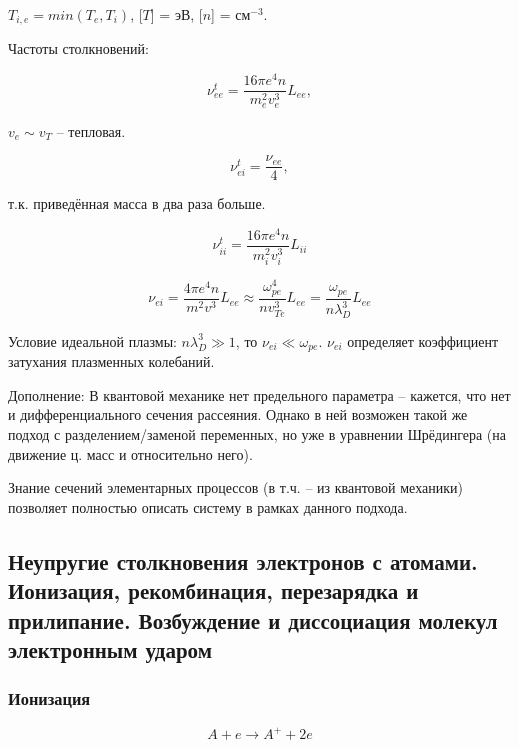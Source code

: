 \documentclass[10pt, a4paper]{article}
\begin{document}
$T_{i,e} = min(T_e, T_i)$, [$T$] = эВ, [$n$] = см$^{-3}$.

Частоты столкновений:

\begin{equation} \label{eq:freq_ee}
	\nu_{ee}^t = \frac{16\pi e^4 n}{m_e^2v_e^3}L_{ee},
\end{equation}

$v_e\sim v_T$ -- тепловая.

\begin{equation} \label{eq:freq_ei}
	\nu_{ei}^t = \frac{\nu_{ee}}{4},
\end{equation}

т.к. приведённая масса в два раза больше.

\begin{equation} \label{eq:freq_ii}
	\nu_{ii}^t = \frac{16\pi e^4 n}{m_i^2v_i^3}L_{ii}
\end{equation}

\begin{equation*}
	\nu_{ei} = \frac{4\pi e^4 n}{m^2v^3}L_{ee} \approx \frac{\omega_{pe}^4}{nv_{Te}^3}L_{ee} = \frac{\omega_{pe}}{n\lambda_D^3}L_{ee}
\end{equation*}

Условие идеальной плазмы: $n\lambda_D^3 \gg 1$, то $\nu_{ei} \ll \omega_{pe}$. $\nu_{ei}$ определяет коэффициент затухания плазменных колебаний.

Дополнение: В квантовой механике нет предельного параметра -- кажется, что нет и дифференциального сечения рассеяния. Однако в ней возможен такой же подход с разделением/заменой переменных, но уже в уравнении Шрёдингера (на движение ц. масс и относительно него). 

Знание сечений элементарных процессов (в т.ч. -- из квантовой механики) позволяет полностью описать систему в рамках данного подхода.

\subsection{Неупругие столкновения электронов с атомами. Ионизация, рекомбинация, перезарядка и прилипание. Возбуждение и диссоциация молекул электронным ударом}

\subsubsection{Ионизация}

\begin{equation}
	A + e \rightarrow A^{+} + 2e
\end{equation}
\end{document}
